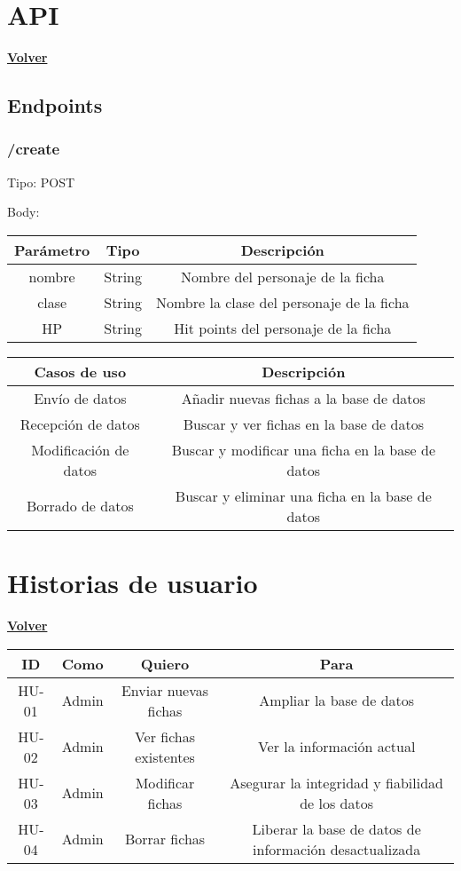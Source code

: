 \documentclass[a4paper,12pt]{article}
\begin{document}
\clearpage

\section{API}
\hyperlink{anchor-indice}{\textbf{Volver}}\\

\subsection{Endpoints}

\subsubsection{/create}
Tipo: POST

Body:
\begin{tabular}{|c|c|c|}
    \hline
    \textbf{Parámetro} & \textbf{Tipo}  & \textbf{Descripción}\\ 
    \hline
    nombre & String & Nombre del personaje de la ficha\\ 
    \hline
    clase & String & Nombre la clase del personaje de la ficha\\ 
    \hline
    HP & String & Hit points del personaje de la ficha\\ 

\end{tabular}

\begin{tabular}{ |c|c| } 
 \hline
 \textbf{Casos de uso} & \textbf{Descripción} \\ 
 \hline
 Envío de datos & Añadir nuevas fichas a la base de datos\\ 
 \hline
 Recepción de datos & Buscar y ver fichas en la base de datos\\
 \hline
 Modificación de datos & Buscar y modificar una ficha en la base de datos\\
 \hline
 Borrado de datos & Buscar y eliminar una ficha en la base de datos\\
 \hline
\end{tabular}


\section{Historias de usuario}
\hyperlink{anchor-indice}{\textbf{Volver}}\\

\begin{tabular}{ |c|c|c|c| } 
 \hline
 \textbf{ID} & \textbf{Como} & \textbf{Quiero} & \textbf{Para} \\ 
 \hline
 HU-01 & Admin & Enviar nuevas fichas & Ampliar la base de datos\\ 
 \hline
 HU-02 & Admin & Ver fichas existentes & Ver la información actual\\
 \hline
 HU-03 & Admin & Modificar fichas & Asegurar la integridad y fiabilidad de los datos\\
 \hline
 HU-04 & Admin & Borrar fichas & Liberar la base de datos de información desactualizada\\
 \hline
\end{tabular}
\end{document}
